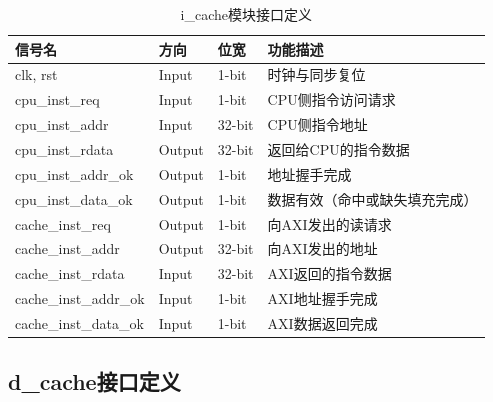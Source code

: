 \begin{table}[htp]
\caption{i\_cache模块接口定义}
\begin{center}
\begin{tabular}{|l|l|l|p{5.5cm}|}
\hline
\textbf{信号名} & \textbf{方向} & \textbf{位宽} & \textbf{功能描述} \\ \hline\hline
clk, rst              & Input  & 1-bit  & 时钟与同步复位 \\ \hline
cpu\_inst\_req        & Input  & 1-bit  & CPU侧指令访问请求 \\ \hline
cpu\_inst\_addr       & Input  & 32-bit & CPU侧指令地址 \\ \hline
cpu\_inst\_rdata      & Output & 32-bit & 返回给CPU的指令数据 \\ \hline
cpu\_inst\_addr\_ok   & Output & 1-bit  & 地址握手完成 \\ \hline
cpu\_inst\_data\_ok   & Output & 1-bit  & 数据有效（命中或缺失填充完成）\\ \hline
cache\_inst\_req      & Output & 1-bit  & 向AXI发出的读请求 \\ \hline
cache\_inst\_addr     & Output & 32-bit & 向AXI发出的地址 \\ \hline
cache\_inst\_rdata    & Input  & 32-bit & AXI返回的指令数据 \\ \hline
cache\_inst\_addr\_ok & Input  & 1-bit  & AXI地址握手完成 \\ \hline
cache\_inst\_data\_ok & Input  & 1-bit  & AXI数据返回完成 \\ \hline
\end{tabular}
\end{center}
\end{table}

\subsection{d\_cache接口定义}

